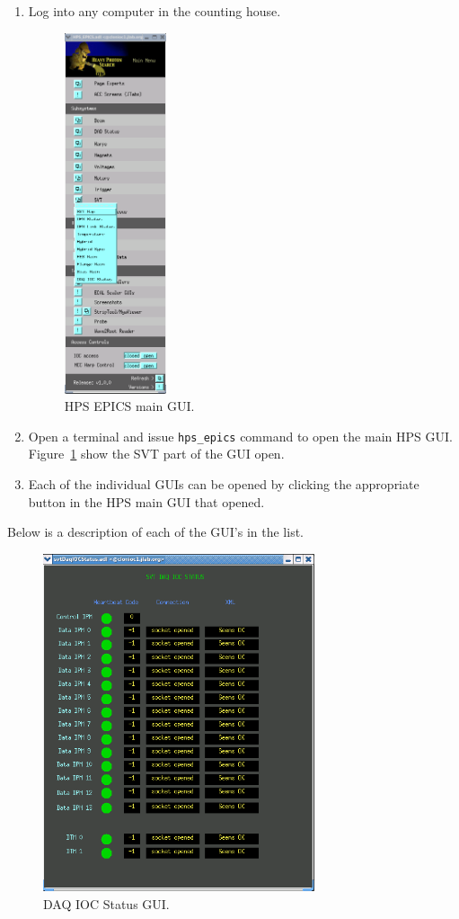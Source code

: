 \documentclass[12pt]{report}
\begin{document}
\begin{enumerate}
\item Log into any computer in the counting house.

\begin{figure}[ht!]
\centering
\includegraphics[width=3cm]{epics_dev_svt.png}
\caption{HPS EPICS main GUI. \label{fig:hps_epics_svt}}
\end{figure}

\item Open a terminal and issue \texttt{hps\_epics} command to open the main HPS GUI. Figure~\ref{fig:hps_epics_svt} show the SVT part of the GUI open.
\item Each of the individual GUIs can be opened by clicking the appropriate button in the HPS main GUI that opened.
\end{enumerate}

Below is a description of each of the GUI's in the list.

\begin{figure}[ht!]
\centering
\includegraphics[width=8cm]{svtDaqIOCStatus.png}
\caption{DAQ IOC Status GUI. \label{fig:svtDaqIOCStatus}}
\end{figure}
\end{document}

